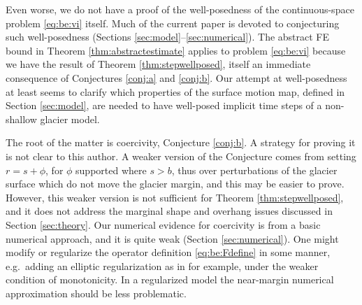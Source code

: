 \documentclass[hidelinks,onefignum,onetabnum,final]{siamart220329}  %
\begin{document}
Even worse, we do not have a proof of the well-posedness of the continuous-space problem \eqref{eq:be:vi} itself.  Much of the current paper is devoted to conjecturing such well-posedness (Sections \ref{sec:model}--\ref{sec:numerical}).  The abstract FE bound in Theorem \ref{thm:abstractestimate} applies to problem \eqref{eq:be:vi} because we have the result of Theorem \ref{thm:stepwellposed}, itself an immediate consequence of Conjectures \ref{conj:a} and \ref{conj:b}.  Our attempt at well-posedness at least seems to clarify which properties of the surface motion map, defined in Section \ref{sec:model}, are needed to have well-posed implicit time steps of a non-shallow glacier model.

The root of the matter is coercivity, Conjecture \ref{conj:b}.  A strategy for proving it is not clear to this author.  A weaker version of the Conjecture comes from setting $r=s + \phi$, for $\phi$ supported where $s>b$, thus over perturbations of the glacier surface which do not move the glacier margin, and this may be easier to prove.  However, this weaker version is not sufficient for Theorem \ref{thm:stepwellposed}, and it does not address the marginal shape and overhang issues discussed in Section \ref{sec:theory}.  Our numerical evidence for coercivity is from a basic numerical approach, and it is quite weak (Section \ref{sec:numerical}).  One might modify or regularize the operator definition \eqref{eq:be:Fdefine} in some manner, e.g.~adding an elliptic regularization as in \cite[section III.2]{KinderlehrerStampacchia1980} for example, under the weaker condition of monotonicity.  In a regularized model the near-margin numerical approximation should be less problematic.




\end{document}
